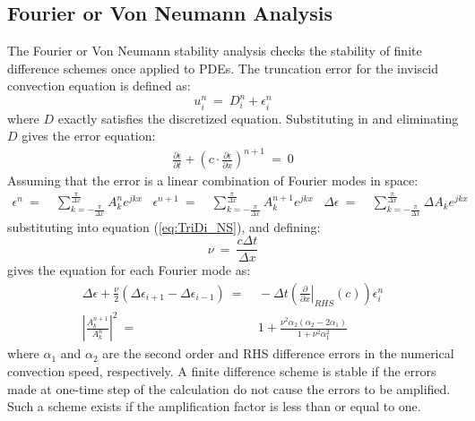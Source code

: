 \documentclass[conf]{new-aiaa}
\begin{document}
\subsection{Fourier or Von Neumann Analysis}
The Fourier or Von Neumann stability analysis checks the stability of finite difference schemes once applied to PDEs. The truncation error for the inviscid convection equation is defined as:
\begin{equation*}
	u_i^n~=~D_i^n+\epsilon_i^n
\end{equation*}
where $D$ exactly satisfies the discretized equation. Substituting in and eliminating $D$ gives the error equation:
\begin{equation}
	\begin{split}
		\label{eq:Implicit_Scheme_Error}
  			\frac{\partial{\epsilon}}{\partial{t}} +\left(c\cdot\frac{\partial{\epsilon}}{\partial{x}}\right)^{n+1}~=~0
	\end{split}
\end{equation}
Assuming that the error is a linear combination of Fourier modes in space: 
\begin{align}
		\label{eq:Error_Fourier}
  			\epsilon^n~=&~\sum_{k=-\frac{\pi}{\Delta{x}}}^{\frac{\pi}{\Delta{x}}}{A_k^n e^{jkx}} & 
  			\epsilon^{n+1}~=&~\sum_{k=-\frac{\pi}{\Delta{x}}}^{\frac{\pi}{\Delta{x}}}{A_k^{n+1} e^{jkx}} &
  			\Delta{\epsilon}~=&~\sum_{k=-\frac{\pi}{\Delta{x}}}^{\frac{\pi}{\Delta{x}}}{\Delta{A_k} e^{jkx}} 
\end{align}
substituting into equation (\ref{eq:TriDi_NS}), and defining:
\begin{equation*}
	\nu~=~\frac{c\Delta{t}}{\Delta{x}}
\end{equation*}
gives the equation for each Fourier mode as:
\begin{equation}
	\begin{split}
		\label{eq:Fourier_Mode_LHS_neq_RHS}
   			\Delta{\epsilon}+\frac{\nu}{2}\left(\Delta{\epsilon_{i+1}}-\Delta{\epsilon_{i-1}} \right)~=&~-\Delta{t}\left(\left.\frac{\partial}{\partial{x}}\right|_{RHS}\left( c \right)\right) {\epsilon}_i^{n} \\
  			\left|\frac{A_k^{n+1}}{A_k^{n}} \right|^2~=&~1+\frac{\nu^2\alpha_2\left(\alpha_2-2\alpha_1\right)}{1+\nu^2\alpha_1^2}
	\end{split}
\end{equation}
where $\alpha_1$ and $\alpha_2$ are the second order and RHS difference errors in the numerical convection speed, respectively. 
A finite difference scheme is stable if the errors made at one-time step of the calculation do not cause the errors to be amplified. 
Such a scheme exists if the amplification factor is less than or equal to one. 
\end{document}

